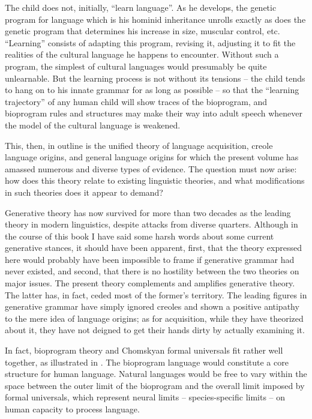The child does not, initially, ``learn language''. As he develops, the genetic program for language which is his hominid inheritance unrolls exactly as does the genetic program that determines his increase
in size, muscular control, etc. ``Learning'' consists of adapting this program, revising it, adjusting it to fit the realities of the cultural language he happens to encounter. Without such a program, the simplest of cultural languages would presumably be quite unlearnable. But the learning process is not without its tensions -- the child tends to hang on to his innate grammar for as long as possible -- so that the ``learning trajectory'' of any human child will show traces of the bioprogram, and bioprogram rules and structures may make their way into adult speech whenever the model of the cultural language is weakened.

This, then, in outline is the unified theory of language acquisition, creole language origins, and general language origins for which the present volume has amassed numerous and diverse types of evidence. The question must now arise: how does this theory relate to existing linguistic theories, and what modifications in such theories does it appear to demand?

Generative theory has now survived for more than two decades as the leading theory in modern linguistics, despite attacks from diverse quarters. Although in the course of this book I have said some harsh words about some current generative stances, it should have been apparent, first, that the theory expressed here would probably have been impossible to frame if generative grammar had never existed, and second, that there is no hostility between the two theories on major issues. The present theory complements and amplifies generative theory. The latter has, in fact, ceded most of the former's territory. The leading figures in generative grammar have simply ignored creoles and shown a positive antipathy to the mere idea of language origins; as for acquisition, while they have theorized about it, they have not deigned to get their hands dirty by actually examining it.

In fact, bioprogram theory and Chomskyan formal universals fit rather well together, as illustrated in . %
The bioprogram language would constitute a core structure for human language. Natural languages would be free to vary within the space between the outer limit of the bioprogram and the overall limit
imposed by formal universals, which represent neural limits -- species-specific limits -- on human capacity to process language.

